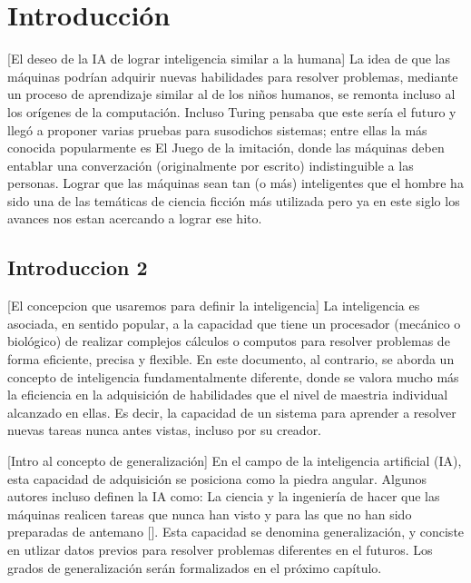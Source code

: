 \chapter*{Introducción}\label{chapter:introduction}

[El deseo de la IA de lograr inteligencia similar a la humana]
La idea de que las máquinas podrían adquirir nuevas habilidades para resolver problemas, mediante un proceso de aprendizaje similar al de los niños humanos, se remonta incluso al los orígenes de la computación. Incluso Turing pensaba que este sería el futuro y llegó a proponer varias pruebas para susodichos sistemas; entre ellas la más conocida popularmente es El Juego de la imitación, donde las máquinas deben entablar una converzación (originalmente por escrito) indistinguible a las personas. Lograr que las máquinas sean tan (o más) inteligentes que el hombre ha sido una de las temáticas de ciencia ficción más utilizada pero ya en este siglo los avances nos estan acercando a lograr ese hito.
\section{Introduccion 2}
[El concepcion que usaremos para definir la inteligencia]
La inteligencia es asociada, en sentido popular, a la capacidad que tiene un procesador (mecánico o biológico) de realizar complejos cálculos o computos para resolver problemas de forma eficiente, precisa y flexible. En este documento, al contrario, se aborda un concepto de inteligencia fundamentalmente diferente, donde se valora mucho más la eficiencia en la adquisición de habilidades que el nivel de maestria individual alcanzado en ellas. Es decir, la capacidad de un sistema para aprender a resolver nuevas tareas nunca antes vistas, incluso por su creador.

[Intro al concepto de generalización]
En el campo de la inteligencia artificial (IA), esta capacidad de adquisición se posiciona como la piedra angular. Algunos autores incluso definen la IA como: La ciencia y la ingeniería de hacer que las máquinas realicen tareas que nunca han visto y para las que no han sido preparadas de antemano [\cite{mccarthy1987generality}]. Esta capacidad se denomina generalización, y conciste en utlizar datos previos para resolver problemas diferentes en el futuros. Los grados de generalización serán formalizados en el próximo capítulo.

